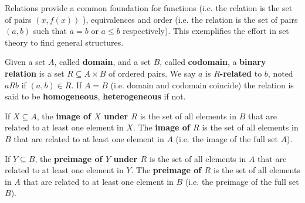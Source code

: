 \documentclass{bareminimum}
\begin{document}
{ 
	
}
\begin{remark}
	Relations provide a common foundation for functions (i.e. the relation is the set of pairs $(x, f(x))$ ), equivalences and order (i.e. the relation is the set of pairs $(a, b)$ such that $a=b$ or $a\leq b$ respectively). This exemplifies the effort in set theory to find general structures.
\end{remark}

\begin{defn}
	Given a set $A$,  called \textbf{domain}, and a set $B$, called \textbf{codomain}, a \textbf{binary relation} is a set $R \subseteq A \times B$ of ordered pairs. We say $a$ is \textbf{$R$-related} to $b$, noted $aRb$ if $(a,b) \in R$. If $A=B$ (i.e. domain and codomain coincide) the relation is said to be \textbf{homogeneous}, \textbf{heterogeneous} if not.
\end{defn}

	
\begin{defn}
	If $X \subseteq A$,  the \textbf{image of $X$ under $R$} is the set of all elements in $B$ that are related to at least one element in $X$. The \textbf{image of $R$} is the set of all elements in $B$ that are related to at least one element in $A$ (i.e. the image of the full set $A$).
	
	If $Y \subseteq B$, the \textbf{preimage of $Y$ under $R$} is the set of all elements in $A$ that are related to at least one element in $Y$. The \textbf{preimage of $R$} is the set of all elements in $A$ that are related to at least one element in $B$ (i.e. the preimage of the full set $B$).
\end{defn}
\end{document}
